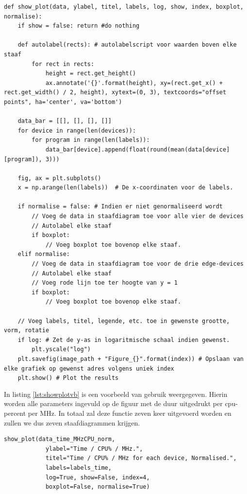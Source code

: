  	
	\begin{lstlisting}[caption={Pseudocode van de show\_plot()-functie.},captionpos=b, label = {lst:showplot}]
def show_plot(data, ylabel, titel, labels, log, show, index, boxplot, normalise):
	if show = false: return #do nothing
		
	def autolabel(rects): # autolabelscript voor waarden boven elke staaf
		for rect in rects:
			height = rect.get_height()
			ax.annotate('{}'.format(height), xy=(rect.get_x() + rect.get_width() / 2, height), xytext=(0, 3), textcoords="offset points", ha='center', va='bottom')
	
	data_bar = [[], [], [], []]
	for device in range(len(devices)):
		for program in range(len(labels)):
			data_bar[device].append(float(round(mean(data[device][program]), 3)))

	fig, ax = plt.subplots()
	x = np.arange(len(labels))	# De x-coordinaten voor de labels.
	
	if normalise = false: # Indien er niet genormaliseerd wordt
		// Voeg de data in staafdiagram toe voor alle vier de devices
		// Autolabel elke staaf
		if boxplot:
			// Voeg boxplot toe bovenop elke staaf.
	elif normalise:
		// Voeg de data in staafdiagram toe voor de drie edge-devices
		// Autolabel elke staaf
		// Voeg rode lijn toe ter hoogte van y = 1
		if boxplot:
			// Voeg boxplot toe bovenop elke staaf.
	
	// Voeg labels, titel, legende, etc. toe in gewenste grootte, vorm, rotatie
	if log: # Zet de y-as in logaritmische schaal indien gewenst.
		plt.yscale("log") 
	plt.savefig(image_path + "Figure_{}".format(index)) # Opslaan van elke grafiek op gewenst adres volgens uniek index
	plt.show() # Plot the results
\end{lstlisting}
 
  	In listing \ref{lst:showplotvb} is een voorbeeld van gebruik weergegeven. Hierin worden alle parameters ingevuld op de figuur met de duur uitgedrukt per \gls{cpu}-percent per MHz. In totaal zal deze functie zeven keer uitgevoerd worden en zullen we dus zeven staafdiagrammen krijgen.  
 
	\begin{lstlisting}[caption={Voorbeeld van gebruik van de show\_plot()-functie.},captionpos=b, label = {lst:showplotvb}]
show_plot(data_time_MHzCPU_norm,
			ylabel="Time / CPU% / MHz.",
			titel="Time / CPU% / MHz for each device, Normalised.",
			labels=labels_time,
			log=True, show=False, index=4,
			boxplot=False, normalise=True)
\end{lstlisting}	
 	
 	
 	


